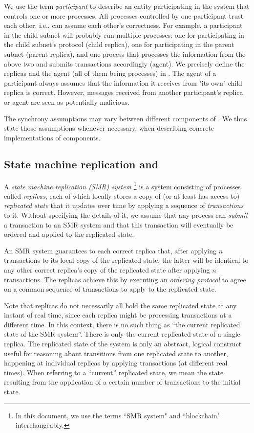 We use the term \emph{participant} to describe an entity participating in the system that controls one or more processes.
All processes controlled by one participant trust each other, i.e., can assume each other's correctness.
For example, a participant in the child subnet will probably run multiple processes:
one for participating in the child subnet's protocol (child replica),
one for participating in the parent subnet (parent replica),
and one process that processes the information from the above two and submits transactions accordingly (\nameAbbr agent).
We precisely define the replicas and the \nameAbbr agent (all of them being processes) in .
The \nameAbbr agent of a participant always assumes that the information it receives from "its own" child replica is correct.
However, messages received from another participant's replica or \nameAbbr agent are seen as potentially malicious.

The synchrony assumptions may vary between different components of \nameAbbr.
We thus state those assumptions whenever necessary, when describing concrete implementations of \nameAbbr components.

\subsection{State machine replication and \dapps}
\label{sec:smr}

A \emph{state machine replication (SMR) system}%
\footnote{In this document, we use the terms ``SMR system" and ``blockchain" interchangeably.}
is a system consisting of processes called \emph{replicas}, each of which locally stores a copy of (or at least has access to) \emph{replicated state}
that it updates over time by applying a sequence of \emph{transactions} to it.
Without specifying the details of it, we assume that any process can \emph{submit} a transaction to an SMR system and that this transaction will eventually be ordered and applied to the replicated state.

An SMR system guarantees to each correct replica that, after applying $n$ transactions to its local copy of the replicated state,
the latter will be identical to any other correct replica’s copy of the replicated state after applying $n$ transactions.
The replicas achieve this by executing an \emph{ordering protocol} to agree on a common sequence of transactions to apply to the replicated state.

Note that replicas do not necessarily all hold the same replicated state at any instant of real time,
since each replica might be processing transactions at a different time.
In this context, there is no such thing as “the current replicated state of the SMR system”.
There is only the current replicated state of a single replica.
The replicated state of the system is only an abstract, logical construct
useful for reasoning about transitions from one replicated state to another,
happening at individual replicas by applying transactions (at different real times).
When referring to a “current” replicated state, we mean the state resulting from the application of a certain number of transactions to the initial state.

